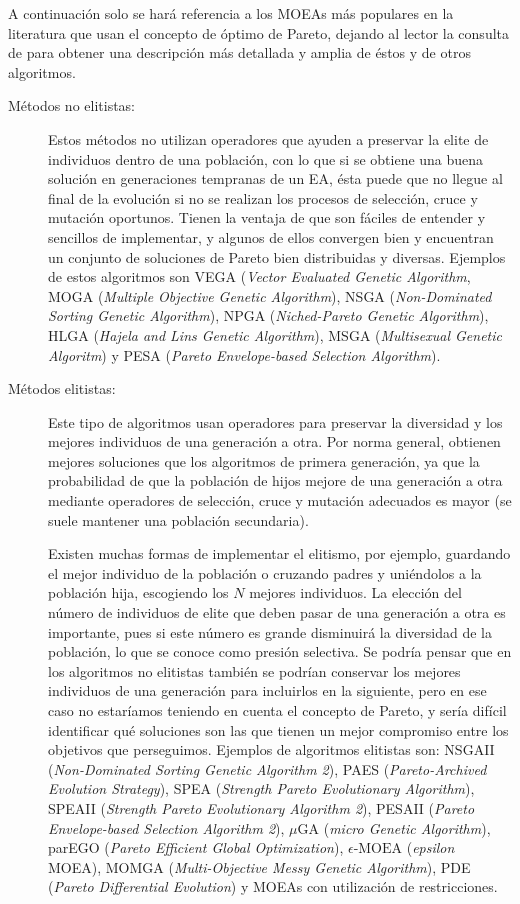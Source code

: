 A continuación solo se hará referencia a los MOEAs más populares en la literatura que usan
el concepto de óptimo de Pareto, dejando al lector la
consulta de \cite{Deb2004,Coello2007} para obtener una descripción más detallada y amplia
de éstos y de otros algoritmos.
\begin{description}
	\item[Métodos no elitistas:] Estos métodos no utilizan operadores que ayuden a
preservar la elite de individuos dentro de una población, con lo que si se obtiene una
buena solución en generaciones tempranas de un EA, ésta puede que no llegue al final de
la evolución si no se realizan los procesos de selección, cruce y mutación oportunos.
Tienen la ventaja de que son fáciles de entender y sencillos de implementar, y algunos de
ellos convergen bien y encuentran un conjunto de soluciones de Pareto bien distribuidas y
diversas. Ejemplos de estos algoritmos son VEGA (\textit{Vector Evaluated Genetic
Algorithm}, MOGA (\textit{Multiple Objective Genetic Algorithm}), NSGA
(\textit{Non-Dominated Sorting Genetic Algorithm}), NPGA (\textit{Niched-Pareto Genetic
Algorithm}), HLGA (\textit{Hajela and Lins Genetic Algorithm}), MSGA (\textit{Multisexual
Genetic Algoritm}) y PESA (\textit{Pareto Envelope-based Selection Algorithm}).

\item[Métodos elitistas:] Este tipo de algoritmos usan operadores para preservar la
diversidad y los mejores individuos de una generación a otra. Por norma
general, obtienen mejores soluciones que los algoritmos de primera generación, ya que
la probabilidad de que la población de hijos mejore de una generación a otra mediante
operadores de selección, cruce y mutación adecuados es mayor (se suele
mantener una población secundaria).

Existen muchas formas de implementar el elitismo, por ejemplo,
guardando el mejor individuo de la población o cruzando padres y uniéndolos a la población
hija, escogiendo los $N$ mejores individuos. La elección del número de
individuos de elite que deben pasar de una generación a otra es importante, pues si
este número es grande disminuirá la diversidad de la población, lo que se conoce como presión
selectiva. Se podría pensar que en los algoritmos no elitistas
también se podrían conservar los mejores individuos de una generación para incluirlos en
la siguiente, pero en ese caso no estaríamos teniendo en cuenta el concepto de Pareto, y
sería difícil identificar qué soluciones son las que tienen un mejor compromiso entre los
objetivos que
perseguimos. Ejemplos de algoritmos elitistas son: NSGAII (\textit{Non-Dominated Sorting
Genetic Algorithm 2}), PAES (\textit{Pareto-Archived Evolution Strategy}), SPEA
(\textit{Strength Pareto Evolutionary Algorithm}), SPEAII (\textit{Strength
Pareto Evolutionary Algorithm 2}), PESAII (\textit{Pareto Envelope-based Selection
Algorithm 2}), $\mu \text{GA}$ (\textit{micro Genetic Algorithm}), parEGO (\textit{Pareto
Efficient Global Optimization}), $\epsilon\text{-MOEA}$ (\textit{epsilon} MOEA), MOMGA
(\textit{Multi-Objective Messy Genetic Algorithm}), PDE (\textit{Pareto Differential
Evolution}) y MOEAs con utilización de restricciones.
\end{description}

